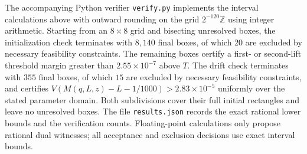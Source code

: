 The accompanying Python verifier \texttt{verify.py} implements the
interval calculations above with outward rounding on the grid
$2^{-120}\mathbb Z$ using integer arithmetic.
Starting from an $8\times8$ grid and bisecting unresolved boxes,
the initialization check terminates with $8{,}140$ final boxes,
of which $20$ are excluded by necessary feasibility constraints.
The remaining boxes certify a first- or second-lift threshold
margin greater than $2.55\times10^{-7}$ above $T$.
The drift check terminates with $355$ final boxes, of which $15$
are excluded by necessary feasibility constraints, and certifies
$V(M(q,L,z)-L-1/1000)>2.83\times10^{-5}$ uniformly over
the stated parameter domain.
Both subdivisions cover their full initial rectangles and leave
no unresolved boxes. The file \texttt{results.json} records the
exact rational lower bounds and the verification counts.
Floating-point calculations only propose rational dual witnesses;
all acceptance and exclusion decisions use exact interval bounds.

